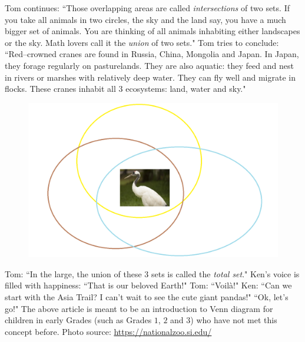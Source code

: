 \begin{multicols}{2}
\begin{figure}[H]
	\end{figure}
	Tom continues: ``Those overlapping areas are called \textit{intersections} of two sets. If you take all animals in two circles, the sky and the land say, you have a much bigger set of animals. You are thinking of all animals inhabiting either landscapes or the sky. Math lovers call it the \textit{union} of two sets." 
	\vskip 0.1cm
	Tom tries to conclude: ``Red--crowned cranes are found in Russia, China, Mongolia and Japan. In Japan, they forage regularly on pasturelands. They are also aquatic: they feed and nest in rivers or marshes with relatively deep water. They can fly well and migrate in flocks. These cranes inhabit all $3$ ecosystems: land, water and sky." 
	\begin{figure}[H]
		\vspace*{-5pt}
		\centering
		\captionsetup{labelformat= empty, justification=centering}
		\includegraphics[width= 0.7\linewidth]{p4}
		\vspace*{-10pt}
	\end{figure}
	Tom: ``In the large, the union of these $3$ sets is called the \textit{total set}."
	\vskip 0.1cm
	Ken's voice is filled with happiness: ``That is our beloved Earth!"
	\vskip 0.1cm
	Tom: ``Voilà!"
	\vskip 0.1cm
	Ken: ``Can we start with the Asia Trail? I can't wait to see the cute giant pandas!"
	\vskip 0.1cm
	``Ok, let's go!"
	\vskip 0.1cm
	The above article is meant to be an introduction to Venn diagram for children in early Grades (such as Grades $1$, $2$ and $3$) who have not met this concept before.
	\vskip 0.1cm
	Photo source: \url{https://nationalzoo.si.edu/}
	\vskip 0.1cm
\end{multicols}
